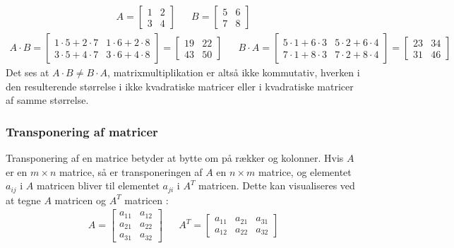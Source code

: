 \documentclass{article}
\begin{document}
\begin{align}
  A = \begin{bmatrix}
    1 & 2 \\
    3 & 4
  \end{bmatrix}
  &&
  B = \begin{bmatrix}
    5 & 6 \\
    7 & 8
  \end{bmatrix}
\end{align}
\begin{align}
  A \cdot B = \begin{bmatrix}
    1 \cdot 5 + 2 \cdot 7 & 1 \cdot 6 + 2 \cdot 8 \\
    3 \cdot 5 + 4 \cdot 7 & 3 \cdot 6 + 4 \cdot 8
  \end{bmatrix} = \begin{bmatrix}
    19 & 22 \\
    43 & 50
  \end{bmatrix}
  &&
  B \cdot A = \begin{bmatrix}
    5 \cdot 1 + 6 \cdot 3 & 5 \cdot 2 + 6 \cdot 4 \\
    7 \cdot 1 + 8 \cdot 3 & 7 \cdot 2 + 8 \cdot 4
  \end{bmatrix} = \begin{bmatrix}
    23 & 34 \\
    31 & 46
  \end{bmatrix}
\end{align}
Det ses at $A \cdot B \neq B \cdot A$, matrixmultiplikation er altså ikke kommutativ, hverken i den resulterende størrelse i ikke kvadratiske matricer eller i kvadratiske matricer af samme størrelse. \parencite{Lauritzen_2019}
\subsubsection{Transponering af matricer}
Transponering af en matrice betyder at bytte om på rækker og kolonner. Hvis $A$ er en $m \times n$ matrice, så er transponeringen af $A$ en $n \times m$ matrice, og elementet $a_{ij}$ i $A$ matricen bliver til elementet $a_{ji}$ i $A^T$ matricen. Dette kan visualiseres ved at tegne $A$ matricen og $A^T$ matricen \parencite{Lauritzen_2019}:
\begin{align}
  A = \begin{bmatrix}
    a_{11} & a_{12} \\
    a_{21} & a_{22} \\
    a_{31} & a_{32}
  \end{bmatrix}
  &&
  A^T = \begin{bmatrix}
    a_{11} & a_{21} & a_{31} \\
    a_{12} & a_{22} & a_{32}
  \end{bmatrix}
\end{align}
\end{document}

